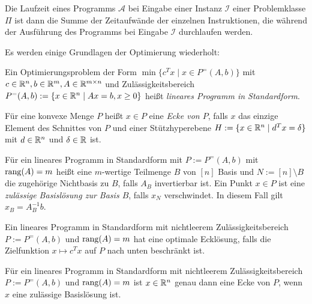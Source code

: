 Die Laufzeit eines Programms $\mathcal{A}$ bei Eingabe einer Instanz $\mathcal{I}$ einer Problemklasse $\Pi$ ist dann die Summe der Zeitaufwände der einzelnen Instruktionen, die während der Ausführung des Programms bei Eingabe $\mathcal{I}$ durchlaufen werden.

Es werden einige Grundlagen der Optimierung wiederholt:
\begin{definition}
	Ein Optimierungsproblem der Form $\min\{ c^T x \mid x \in P^=(A, b) \}$ mit $c\in\mathbb{R}^n, b\in\mathbb{R}^m, A\in\mathbb{R}^{m\times n}$ und Zulässigkeitsbereich $P^=(A,b):= \{ x\in\mathbb{R}^n \mid Ax = b, x\geq 0 \}$ heißt \emph{lineares Programm in Standardform}.
\end{definition}

\begin{definition}
	Für eine konvexe Menge $P$ heißt $x\in P$ eine \emph{Ecke von $P$}, falls $x$ das einzige Element des Schnittes von $P$ und einer Stützhyperebene $H:=\{ x\in\mathbb{R}^n \mid d^T x = \delta \}$ mit $d\in\mathbb{R}^n$ und $\delta\in\mathbb{R}$ ist.
\end{definition}

\begin{definition}
Für ein lineares Programm in Standardform mit $P:=P^=(A, b)$ mit $\operatorname{rang}(A) = m$ heißt eine $m$-wertige Teilmenge $B$ von $[n]$ Basis und $N:= [n]\setminus B$ die zugehörige Nichtbasis zu $B$, falls $A_B$ invertierbar ist.
Ein Punkt $x\in P$ ist eine \emph{zulässige Basislösung zur Basis $B$}, falls $x_N$ verschwindet.
In diesem Fall gilt $x_B = A_B^{-1} b$.
\end{definition}

\begin{satz}\label{satz-existence-optimality-for-lps}
	Ein lineares Programm in Standardform mit nichtleerem Zulässigkeitsbereich $P:=P^=(A,b)$ und $\operatorname{rang}(A) = m$ hat eine optimale Ecklösung, falls die Zielfunktion $x\mapsto c^T x$ auf $P$ nach unten beschränkt ist.
\end{satz}

\begin{satz}\label{satz-ecke-basislsg}
Für ein lineares Programm in Standardform mit nichtleerem Zulässigkeitsbereich $P:=P^=(A,b)$ und $\operatorname{rang}(A) = m$ ist $x\in\mathbb{R}^n$ genau dann eine Ecke von $P$, wenn $x$ eine zulässige Basislösung ist.
\end{satz}

